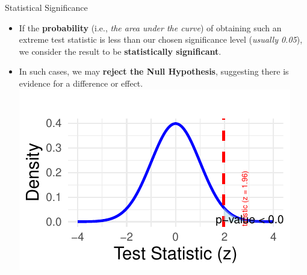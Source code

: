 \documentclass[
  ignorenonframetext,
]{beamer}
\providecommand{\tightlist}{%
  \setlength{\itemsep}{0pt}\setlength{\parskip}{0pt}}
\begin{document}
\begin{frame}{Statistical Significance}
\label{statistical-significance}
\begin{itemize}
\tightlist
\item
  If the \textbf{probability} (i.e., \emph{the area under the curve}) of
  obtaining such an extreme test statistic is less than our chosen
  significance level (\emph{usually 0.05}), we consider the result to be
  \textbf{statistically significant}.
\end{itemize}

\begin{itemize}
\tightlist
\item
  In such cases, we may \textbf{reject the Null Hypothesis}, suggesting
  there is evidence for a difference or effect.
  \includegraphics{M5-Hypothesis-Testing,-Probability-and-Distribution_files/figure-beamer/unnamed-chunk-9-1.pdf}
\end{itemize}
\end{frame}
\end{document}
